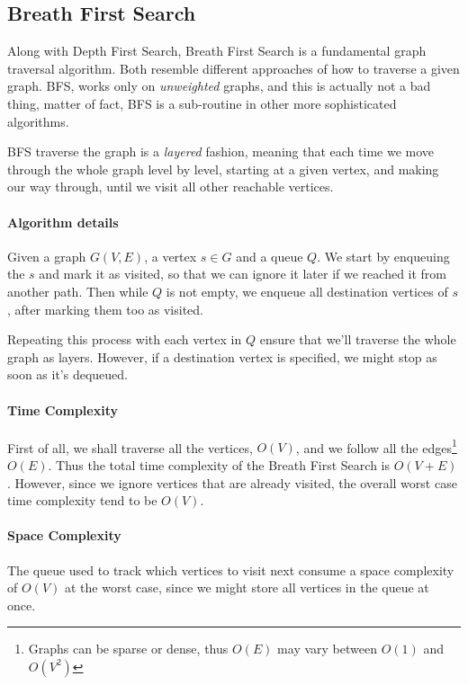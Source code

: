 \documentclass[12pt]{article}
\begin{document}
\subsection{Breath First Search}

Along with Depth First Search, Breath First Search is a fundamental graph traversal algorithm. Both resemble different approaches of how to traverse a given graph. BFS, works only on \textit{unweighted} graphs, and this is actually not a bad thing, matter of fact, BFS is a sub-routine in other more sophisticated algorithms.

BFS traverse the graph is a \textit{layered} fashion, meaning that each time we move through the whole graph level by level, starting at a given vertex, and making our way through, until we visit all other reachable vertices.

\paragraph{Algorithm details} Given a graph $G(V,E)$, a vertex $s \in G$ and a queue $Q$. We start by enqueuing the $s$ and mark it as visited, so that we can ignore it later if we reached it from another path. Then while $Q$ is not empty, we enqueue all destination vertices of $s$, after marking them too as visited.

Repeating this process with each vertex in $Q$ ensure that we'll traverse the whole graph as layers. However, if a destination vertex is specified, we might stop as soon as it's dequeued.

\paragraph{Time Complexity} First of all, we shall traverse all the vertices, $O(V)$, and we follow all the edges\footnote{Graphs can be sparse or dense, thus $O(E)$ may vary between $O(1)$ and $O(V^2)$} $O(E)$. Thus the total time complexity of the Breath First Search is $O(V+E)$. However, since we ignore vertices that are already visited, the overall worst case time complexity tend to be $O(V)$.

\paragraph{Space Complexity} The queue used to track which vertices to visit next consume a space complexity of $O(V)$ at the worst case, since we might store all vertices in the queue at once.
\end{document}

